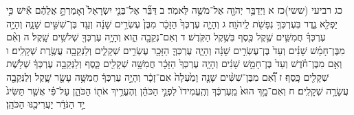 \documentclass[twoside, openany, parskip=half, 11pt]{book}
\begin{document}
כג רביעי (ששי)כז א וַיְדַבֵּ֥ר יְהֹוָ֖ה אֶל־מֹשֶׁ֥ה לֵּאמֹֽר׃ ב דַּבֵּ֞ר אֶל־בְּנֵ֤י יִשְׂרָאֵל֙ וְאָמַרְתָּ֣ אֲלֵהֶ֔ם אִ֕ישׁ כִּ֥י יַפְלִ֖א נֶ֑דֶר בְּעֶרְכְּךָ֥ נְפָשֹׁ֖ת לַֽיהֹוָֽה׃ ג וְהָיָ֤ה עֶרְכְּךָ֙ הַזָּכָ֔ר מִבֶּן֙ עֶשְׂרִ֣ים שָׁנָ֔ה וְעַ֖ד בֶּן־שִׁשִּׁ֣ים שָׁנָ֑ה וְהָיָ֣ה עֶרְכְּךָ֗ חֲמִשִּׁ֛ים שֶׁ֥קֶל כֶּ֖סֶף בְּשֶׁ֥קֶל הַקֹּֽדֶשׁ׃ ד וְאִם־נְקֵבָ֖ה הִ֑וא וְהָיָ֥ה עֶרְכְּךָ֖ שְׁלֹשִׁ֥ים שָֽׁקֶל׃ ה וְאִ֨ם מִבֶּן־חָמֵ֜שׁ שָׁנִ֗ים וְעַד֙ בֶּן־עֶשְׂרִ֣ים שָׁנָ֔ה וְהָיָ֧ה עֶרְכְּךָ֛ הַזָּכָ֖ר עֶשְׂרִ֣ים שְׁקָלִ֑ים וְלַנְּקֵבָ֖ה עֲשֶׂ֥רֶת שְׁקָלִֽים׃ ו וְאִ֣ם מִבֶּן־חֹ֗דֶשׁ וְעַד֙ בֶּן־חָמֵ֣שׁ שָׁנִ֔ים וְהָיָ֤ה עֶרְכְּךָ֙ הַזָּכָ֔ר חֲמִשָּׁ֥ה שְׁקָלִ֖ים כָּ֑סֶף וְלַנְּקֵבָ֣ה עֶרְכְּךָ֔ שְׁלֹ֥שֶׁת שְׁקָלִ֖ים כָּֽסֶף׃ ז וְ֠אִ֠ם מִבֶּן־שִׁשִּׁ֨ים שָׁנָ֤ה וָמַ֙עְלָה֙ אִם־זָכָ֔ר וְהָיָ֣ה עֶרְכְּךָ֔ חֲמִשָּׁ֥ה עָשָׂ֖ר שָׁ֑קֶל וְלַנְּקֵבָ֖ה עֲשָׂרָ֥ה שְׁקָלִֽים׃ ח וְאִם־מָ֥ךְ הוּא֙ מֵֽעֶרְכֶּ֔ךָ וְהֶֽעֱמִידוֹ֙ לִפְנֵ֣י הַכֹּהֵ֔ן וְהֶעֱרִ֥יךְ אֹת֖וֹ הַכֹּהֵ֑ן עַל־פִּ֗י אֲשֶׁ֤ר תַּשִּׂיג֙ יַ֣ד הַנֹּדֵ֔ר יַעֲרִיכֶ֖נּוּ הַכֹּהֵֽן׃
\end{document}

